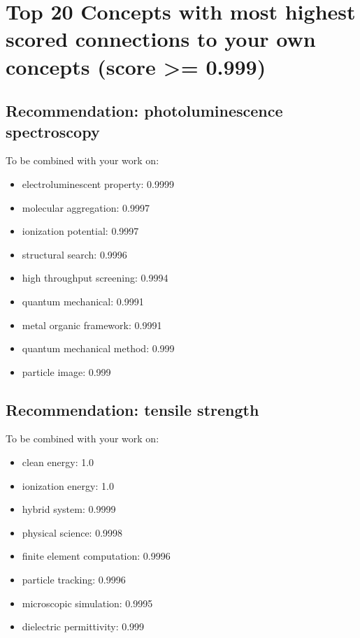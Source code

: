 \documentclass{article}%
\begin{document}
%
\section{Top 20 Concepts with most highest scored connections to your own concepts (score >= 0.999)}%
\label{sec:Top20Conceptswithmosthighestscoredconnectionstoyourownconcepts(score>=0.999)}%
\subsection{Recommendation: photoluminescence spectroscopy}%
\label{subsec:Recommendationphotoluminescencespectroscopy}%
To be combined with your work on:%
\begin{itemize}%
\item%
electroluminescent property: 0.9999%
\item%
molecular aggregation: 0.9997%
\item%
ionization potential: 0.9997%
\item%
structural search: 0.9996%
\item%
high throughput screening: 0.9994%
\item%
quantum mechanical: 0.9991%
\item%
metal organic framework: 0.9991%
\item%
quantum mechanical method: 0.999%
\item%
particle image: 0.999%
\end{itemize}

%
\subsection{Recommendation: tensile strength}%
\label{subsec:Recommendationtensilestrength}%
To be combined with your work on:%
\begin{itemize}%
\item%
clean energy: 1.0%
\item%
ionization energy: 1.0%
\item%
hybrid system: 0.9999%
\item%
physical science: 0.9998%
\item%
finite element computation: 0.9996%
\item%
particle tracking: 0.9996%
\item%
microscopic simulation: 0.9995%
\item%
dielectric permittivity: 0.999%
\end{itemize}

%
\end{document}
